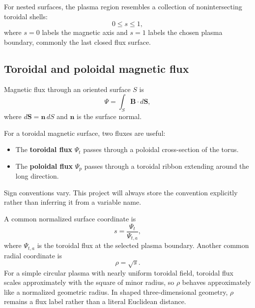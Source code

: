 For nested surfaces, the plasma region resembles a collection of nonintersecting toroidal shells:
\begin{equation}
0\leq s\leq1,
\end{equation}
where $s=0$ labels the magnetic axis and $s=1$ labels the chosen plasma boundary, commonly the last closed flux surface.

\subsection{Toroidal and poloidal magnetic flux}
Magnetic flux through an oriented surface $S$ is
\begin{equation}
\Psi=\int_S\mathbf B\cdot d\mathbf S,
\end{equation}
where $d\mathbf S=\mathbf n\,dS$ and $\mathbf n$ is the surface normal.

For a toroidal magnetic surface, two fluxes are useful:
\begin{itemize}[leftmargin=1.6em]
\item The \textbf{toroidal flux} $\Psi_t$ passes through a poloidal cross-section of the torus.
\item The \textbf{poloidal flux} $\Psi_p$ passes through a toroidal ribbon extending around the long direction.
\end{itemize}
Sign conventions vary. This project will always store the convention explicitly rather than inferring it from a variable name.

A common normalized surface coordinate is
\begin{equation}
s=\frac{\Psi_t}{\Psi_{t,a}},
\label{eq:s_normalized_flux}
\end{equation}
where $\Psi_{t,a}$ is the toroidal flux at the selected plasma boundary. Another common radial coordinate is
\begin{equation}
\rho=\sqrt{s}.
\label{eq:rho_sqrt_s}
\end{equation}
For a simple circular plasma with nearly uniform toroidal field, toroidal flux scales approximately with the square of minor radius, so $\rho$ behaves approximately like a normalized geometric radius. In shaped three-dimensional geometry, $\rho$ remains a flux label rather than a literal Euclidean distance.

